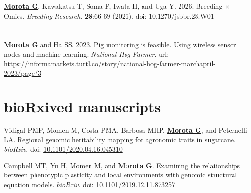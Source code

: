 \documentclass[margin,line,10pt]{res}
\newenvironment{list1}{
  \begin{list}{\ding{113}}{%
      \setlength{\itemsep}{0in}
      \setlength{\parsep}{0in} \setlength{\parskip}{0in}
      \setlength{\topsep}{0in} \setlength{\partopsep}{0in} 
      \setlength{\leftmargin}{0.17in}}}{\end{list}}
\begin{document}
\begin{resume}
\section{}
\begin{list1}

\item [\bf{2}.] {\bf \underline{Morota G}}, Kawakatsu T, Soma F, Iwata H, and Uga Y. 2026. Breeding $\times$ Omics. \emph{Breeding Research}. \textbf{28}:66-69 (2026). doi: \textcolor{blue}{\href{https://doi.org/10.1270/jsbbr.28.W01}{10.1270/jsbbr.28.W01}}   

\end{list1}


\section{}
\begin{list1}

  \item [{\bf 1}.] \textbf{\underline{Morota G}} and Ha SS. 2023. Pig monitoring is feasible. Using wireless sensor nodes and machine learning. \emph{National Hog Farmer}. url: \textcolor{blue}{\href{https://informamarkets.turtl.co/story/national-hog-farmer-marchapril-2023/page/3}{https://informamarkets.turtl.co/story/national-hog-farmer-marchapril-2023/page/3}}

\end{list1}




\vspace{1.0cm}
\section{\sc bioRxived manuscripts}

\begin{list1}

  \item [{\bf 2}.] Vidigal PMP, Momen M, Costa PMA, Barbosa MHP, \textbf{\underline{Morota G}}, and Peternelli LA. Regional genomic heritability mapping for agronomic traits in sugarcane. \emph{bioRxiv}. doi: \textcolor{blue}{\href{https://doi.org/10.1101/2020.04.16.045310}{10.1101/2020.04.16.045310}}

  \vspace{0.5cm}

\item [{\bf 1}.] Campbell MT, Yu H, Momen M, and \textbf{\underline{Morota G}}. Examining the relationships between phenotypic plasticity and local environments with genomic structural equation models. \emph{bioRxiv}. doi: \textcolor{blue}{\href{https://doi.org/10.1101/2019.12.11.873257}{10.1101/2019.12.11.873257}}
  


\end{list1}
\end{resume}
\end{document}
